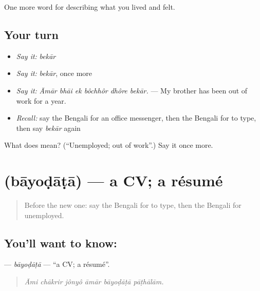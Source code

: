 \begin{grammarlens}[title={What you've built}]
One more word for describing what you lived and felt.
\end{grammarlens}

\subsection*{Your turn}
\begin{itemize}
\raggedright
  \item \emph{Say it:} \emph{bekār}
  \item \emph{Say it:} \emph{bekār}, once more
  \item \emph{Say it:} \emph{Āmār bhāi ek bôchhôr dhôre bekār.} — My brother has been out of work for a year.
  \item \emph{Recall:} say the Bengali for an office messenger, then the Bengali for to type, then say \emph{bekār} again
\end{itemize}

\begin{tcolorbox}[breakable,colback=teal!4,colframe=teal!35!black,title={Before you move on}]
What does  mean? (\textquotedblleft{}Unemployed; out of work\textquotedblright{}.) Say it once more.
\end{tcolorbox}
\section[\texorpdfstring{\bn{বায়োডাটা} (bāyoḍāṭā)}{বায়োডাটা (bāyoḍāṭā)}]{ (bāyoḍāṭā) — a CV; a résumé}

\label{lesson:BN-C494-bayodata}



\begin{quote}
Before the new one: say the Bengali for to type, then the Bengali for unemployed.
\end{quote}

\subsection*{You'll want to know: }
\textbf{} — \emph{bāyoḍāṭā} — \textquotedblleft{}a CV; a résumé\textquotedblright{}.

\begin{quote}
     
\end{quote}

\begin{quote}
\emph{Āmi chākrir jônyô āmār bāyoḍāṭā pāṭhālām.}
\end{quote}

